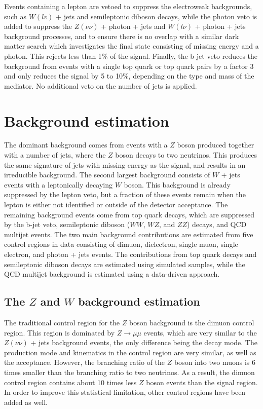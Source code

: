 Events containing a lepton are vetoed to suppress the electroweak backgrounds, such as $W(lv)$ + jets and semileptonic diboson decays, while the photon veto is added to suppress the $Z(\nu\nu)$ + photon + jets and $W(l\nu)$ + photon + jets background processes, and to ensure there is no overlap with a similar dark matter search which investigates the final state consisting of missing energy and a photon. This rejects less than 1\% of the signal. Finally, the b-jet veto reduces the background from events with a single top quark or top quark pairs by a factor 3 and only reduces the signal by 5 to 10\%, depending on the type and mass of the mediator. No additional veto on the number of jets is applied.

\section{Background estimation}
\label{sec:bkgd}

% 

The dominant background comes from events with a $Z$ boson produced together with a number of jets, where the $Z$ boson decays to two neutrinos. This produces the same signature of jets with missing energy as the signal, and results in an irreducible background. The second largest background consists of $W$ + jets events with a leptonically decaying $W$ boson. This background is already suppressed by the lepton veto, but a fraction of these events remain when the lepton is either not identified or outside of the detector acceptance. The remaining background events come from top quark decays, which are suppressed by the b-jet veto, semileptonic diboson ($WW$, $WZ$, and $ZZ$) decays, and QCD multijet events. The two main background contributions are estimated from five control regions in data consisting of dimuon, dielectron, single muon, single electron, and photon + jets events.  The contributions from top quark decays and semileptonic diboson decays are estimated using simulated samples, while the QCD multijet background is estimated using a data-driven approach.

\subsection{The \boldmath$Z$ and \boldmath$W$ background estimation}
\label{sec:main_bkgd}

The traditional control region for the $Z$ boson background is the dimuon control region. This region is dominated by $Z\rightarrow\mu\mu$ events, which are very similar to the $Z(\nu\nu)$ + jets background events, the only difference being the decay mode. The production mode and kinematics in the control region are very similar, as well as the acceptance. However, the branching ratio of the $Z$ boson into two muons is 6 times smaller than the branching ratio to two neutrinos. As a result, the dimuon control region contains about 10 times less $Z$ boson events than the signal region. In order to improve this statistical limitation, other control regions have been added as well.

